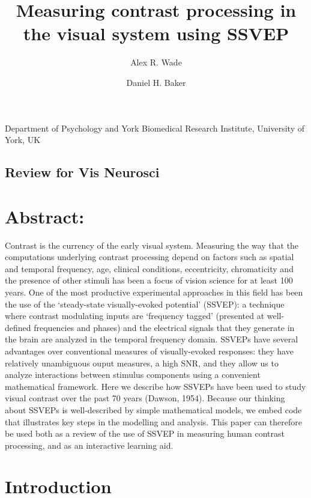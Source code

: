 \documentclass[
  letterpaper,
  DIV=11,
  numbers=noendperiod]{scrartcl}
\title{Measuring contrast processing in the visual system using SSVEP}
\author{Alex R. Wade \and Daniel H. Baker}
\date{}
\begin{document}
\maketitle

Department of Psychology and York Biomedical Research Institute,
University of York, UK

\subsection{Review for Vis Neurosci}\label{review-for-vis-neurosci}

\section{Abstract:}\label{abstract}

Contrast is the currency of the early visual system. Measuring the way
that the computations underlying contrast processing depend on factors
such as spatial and temporal frequency, age, clinical conditions,
eccentricity, chromaticity and the presence of other stimuli has been a
focus of vision science for at least 100 years. One of the most
productive experimental approaches in this field has been the use of the
`steady-state visually-evoked potential' (SSVEP): a technique where
contrast modulating inputs are `frequency tagged' (presented at
well-defined frequencies and phases) and the electrical signals that
they generate in the brain are analyzed in the temporal frequency
domain. SSVEPs have several advantages over conventional measures of
visually-evoked responses: they have relatively unambiguous ouput
measures, a high SNR, and they allow us to analyze interactions between
stimulus components using a convenient mathematical framework. Here we
describe how SSVEPs have been used to study visual contrast over the
past 70 years (Dawson, 1954). Because our thinking about SSVEPs is
well-described by simple mathematical models, we embed code that
illustrates key steps in the modelling and analysis. This paper can
therefore be used both as a review of the use of SSVEP in measuring
human contrast processing, and as an interactive learning aid.

\section{Introduction}\label{introduction}
\end{document}
